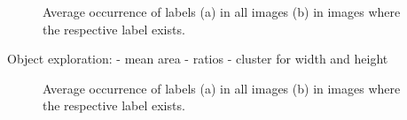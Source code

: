 \documentclass{article}
\begin{document}
\begin{figure}[t!]
    \centering
    \caption{Average occurrence of labels (a) in all images (b) in images where the respective label exists.}
    \label{fig:occurrence}
\end{figure}

Object exploration: 
- mean area
- ratios
- cluster for width and height

\begin{figure}[t!]
    \centering
    \caption{Average occurrence of labels (a) in all images (b) in images where the respective label exists.}
    \label{fig:occurrence}
\end{figure}
\end{document}
